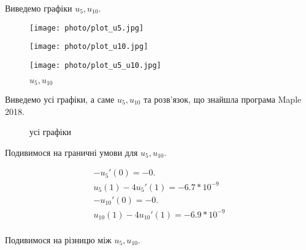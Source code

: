 \documentclass[14pt,a4paper]{scrartcl}
\begin{document}
\newpage	
	Виведемо графіки $u_5, u_{10}$.
	
	\begin{figure}[h]
		\begin{center}
			\begin{minipage}[h]{0.2\linewidth}
				\texttt{[image: photo/plot\_u5.jpg]}
				\caption{$u_5$} %
				\label{ris:after_floodFill} %
			\end{minipage}
			\hfill 
			\begin{minipage}[h]{0.2\linewidth}
				\texttt{[image: photo/plot\_u10.jpg]}
				\caption{$u_{10}$}
				\label{ris:after_dilation}
			\end{minipage}
			\hfill
			\begin{minipage}[h]{0.2\linewidth}
				\texttt{[image: photo/plot\_u5\_u10.jpg]}
				\caption{$u_5, u_10$} %
				\label{ris:after_erode} %
			\end{minipage}
		\end{center}
	\end{figure}

Виведемо усі графіки, а саме $u_5, u_10$ та розв'язок, що знайшла програма Maple 2018.

	\begin{figure}[h]
		\caption{усі графіки}
		\label{fig:image}
	\end{figure}

Подивимося на граничні умови для $u_5, u_10$.

	\begin{gather}
		-u_5'(0) =-0. \\
		u_5(1) - 4u_5'(1) =-6.7*10^{-9}\\
		-u_{10}'(0) =-0. \\
		u_{10}(1) - 4u_{10}'(1) =-6.9*10^{-9}\\
	\end{gather}

Подивимося на різницю між $u_5, u_{10}$.
\end{document}
